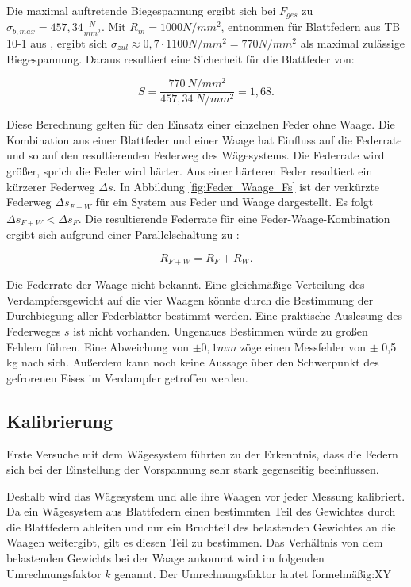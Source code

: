 Die maximal auftretende Biegespannung ergibt sich bei $F_{ges}$ zu  $\sigma_{b,max} = 457,34 \frac{N}{mm^2}.$ Mit $R_m =1000 N/mm^2$, entnommen für Blattfedern aus TB 10-1 aus \citep{Wittel2011}, ergibt sich  $\sigma_{zul}\approx 0,7 \cdot 1100 N/mm^2 = 770 N/mm^2  $ als maximal zulässige Biegespannung. Daraus resultiert eine Sicherheit für die Blattfeder von:

\begin{equation}
S= \frac{770~N/mm^2}{457,34~N/mm^2} = 1,68.
\end{equation}





Diese Berechnung gelten für den Einsatz einer einzelnen Feder ohne Waage. Die Kombination aus einer Blattfeder und einer Waage hat Einfluss auf die Federrate und so auf den resultierenden Federweg des Wägesystems. Die Federrate wird größer, sprich die Feder wird härter. Aus einer härteren Feder resultiert ein kürzerer Federweg $\Delta s$.  In Abbildung \ref{fig:Feder_Waage_Fs} ist der verkürzte Federweg $\Delta s_{F+W}$ für ein System aus Feder und Waage dargestellt. Es folgt $\Delta s_{F+W}< \Delta s_{F}$. Die resultierende Federrate für eine Feder-Waage-Kombination ergibt sich aufgrund einer Parallelschaltung zu :

\begin{equation}
R_{F+W}= R_F + R_W.
\end{equation}

Die Federrate der Waage nicht bekannt. Eine gleichmäßige Verteilung des Verdampfersgewicht auf die vier Waagen könnte durch die Bestimmung der Durchbiegung aller Federblätter bestimmt werden. Eine praktische Auslesung des Federweges $s$ ist nicht vorhanden. Ungenaues Bestimmen würde zu großen Fehlern führen. Eine Abweichung von $\pm 0,1 mm$ zöge einen Messfehler von $\pm$ 0,5 kg nach sich.  Außerdem kann noch keine Aussage über den Schwerpunkt des gefrorenen Eises im Verdampfer getroffen werden.

\subsection{Kalibrierung}
\label{subsec:Waagen-Kalibrierung}


Erste Versuche mit dem Wägesystem führten zu der Erkenntnis, dass die Federn sich bei der Einstellung der Vorspannung sehr stark gegenseitig beeinflussen. 
 
Deshalb wird das Wägesystem und alle ihre Waagen vor jeder Messung kalibriert. Da ein Wägesystem aus Blattfedern einen bestimmten Teil des Gewichtes durch die Blattfedern ableiten und nur ein Bruchteil des belastenden Gewichtes an die Waagen weitergibt, gilt es diesen Teil zu bestimmen. Das Verhältnis von dem belastenden Gewichts bei der Waage ankommt wird im folgenden Umrechnungsfaktor $k$ genannt. Der Umrechnungsfaktor lautet formelmäßig:XY


